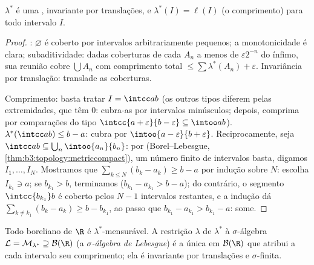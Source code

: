 \begin{lemma}\label{lem:b3:measure:outerbasics}
$\lambda^*$ é uma , invariante por translações, e $\lambda^*(I) = \ell(I)$ (o
comprimento) para todo intervalo $I$.
\end{lemma}

\begin{proof}
: $\varnothing$ é coberto por intervalos arbitrariamente
pequenos; a monotonicidade é clara; subaditividade: dadas coberturas de
cada $A_n$ a menos de $\varepsilon 2^{-n}$ do ínfimo, sua reunião cobre $\bigcup A_n$ com
comprimento total $\leq \sum
\lambda^*(A_n) + \varepsilon$. Invariância por translação: translade as
coberturas.

Comprimento: basta tratar $I = \intcc ab$ (os outros tipos diferem pelas
extremidades, que têm  $0$: cubra-as por intervalos
minúsculos; depois, comprima por comparações do tipo $\intcc{a+\varepsilon}{b -
\varepsilon} \subseteq \intoo ab$). $\lambda^*(\intcc ab) \leq b - a$:
cubra por $\intoo{a-\varepsilon}{b+\varepsilon}$. Reciprocamente, seja $\intcc
ab \subseteq \bigcup_n\intoo{a_n}{b_n}$: por \emph{}
(Borel--Lebesgue, \cref{thm:b3:topology:metriccompact}), um número finito de intervalos
basta, digamos $I_1, \dots, I_N$. Mostramos que $\sum_{k\leq N}(b_k -
a_k) \geq b - a$ por indução sobre $N$:
escolha $I_{k_1} \ni a$; se $b_{k_1} > b$, terminamos ($b_{k_1} - a_{k_1} > b - a$); do contrário, o segmento
$\intcc{b_{k_1}}b$ é coberto pelos $N - 1$ intervalos restantes, e a indução dá
$\sum_{k \neq k_1}(b_k - a_k)
\geq b - b_{k_1}$, ao passo que $b_{k_1} - a_{k_1} > b_{k_1} - a$: some.
\end{proof}

\begin{theorem}\label{thm:b3:measure:lebesgue}
Todo boreliano de $\R$ é $\lambda^*$-mensurável. A restrição $\lambda$ de
$\lambda^*$ à $\sigma$-álgebra $\mathcal L = \mathcal M_{\lambda^*} \supseteq \mathcal B(\R)$ (a \emph{$\sigma$-álgebra de
Lebesgue}) é a única  em $\mathcal B(\R)$ que atribui a cada intervalo seu
comprimento; ela é invariante por translações e $\sigma$-finita.
\end{theorem}

